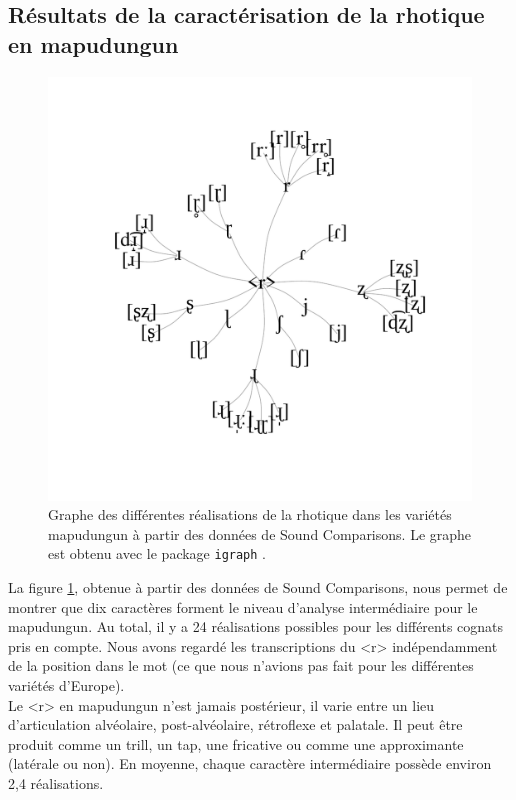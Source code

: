 \subsection{Résultats de la caractérisation de la rhotique en mapudungun}

\begin{figure}
	\centering
	\includegraphics[width=0.7\linewidth]{substance/images/mapudungung_rhotics}
	\caption[Graphe des différentes réalisations de la rhotique dans les variétés mapudungun]{Graphe des différentes réalisations de la rhotique dans les variétés mapudungun à partir des données de Sound Comparisons. Le graphe est obtenu avec le package \texttt{igraph} \parencite{csardiIgraphSoftwarePackage2006}.}
	\label{fig:mapudungungrhotics}
\end{figure}

La figure \ref{fig:mapudungungrhotics}, obtenue à partir des données de Sound Comparisons, nous permet de  montrer que dix caractères forment le niveau d'analyse intermédiaire pour le mapudungun. Au total, il y a 24 réalisations possibles pour les différents cognats pris en compte. Nous avons regardé les transcriptions du <r> indépendamment de la position dans le mot (ce que nous n'avions pas fait pour les différentes variétés d'Europe).\\

Le <r> en mapudungun n'est jamais postérieur, il varie entre un lieu d'articulation alvéolaire, post-alvéolaire, rétroflexe et palatale. Il peut être produit comme un trill, un tap, une fricative ou comme une approximante (latérale ou non).
En moyenne, chaque caractère intermédiaire possède environ 2,4 réalisations.\\

